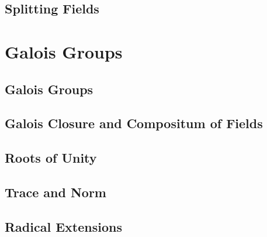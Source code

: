 

\subsection{Splitting Fields}



\vfill\break

\section{Galois Groups}

\subsection{Galois Groups}



\subsection{Galois Closure and Compositum of Fields}



\subsection{Roots of Unity}



\subsection{Trace and Norm}



\subsection{Radical Extensions}



\bye

